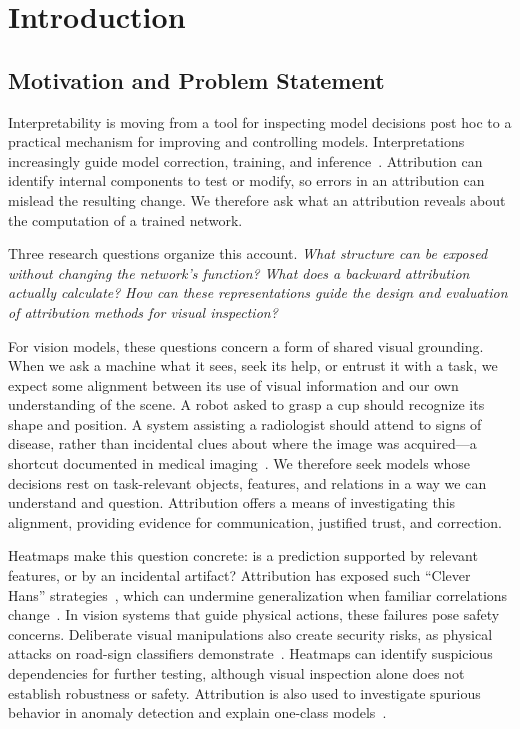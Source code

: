 \chapter{Introduction}\label{ch:introduction}

\section{Motivation and Problem Statement}\label{sec:motivation}

Interpretability is moving from a tool for inspecting model decisions post hoc to a practical mechanism for improving and controlling models. Interpretations increasingly guide model correction, training, and inference~\parencite{Anders2020ClArC,Pahde2023R2R,Ross2017RightReasons,Komorowski2026AGD}.
Attribution can identify internal components to test or modify, so errors in an attribution can mislead the resulting change. We therefore ask what an attribution reveals about the computation of a trained network.

Three research questions organize this account. \emph{What structure can be exposed without changing the network's function?} \emph{What does a backward attribution actually calculate?} \emph{How can these representations guide the design and evaluation of attribution methods for visual inspection?}

For vision models, these questions concern a form of shared visual grounding. When we ask a machine what it sees, seek its help, or entrust it with a task, we expect some alignment between its use of visual information and our own understanding of the scene. A robot asked to grasp a cup should recognize its shape and position. A system assisting a radiologist should attend to signs of disease, rather than incidental clues about where the image was acquired---a shortcut documented in medical imaging~\parencite{Zech2018Pneumonia}. We therefore seek models whose decisions rest on task-relevant objects, features, and relations in a way we can understand and question. Attribution offers a means of investigating this alignment, providing evidence for communication, justified trust, and correction.

Heatmaps make this question concrete: is a prediction supported by relevant features, or by an incidental artifact? Attribution has exposed such ``Clever Hans'' strategies~\parencite{Lapuschkin2019}, which can undermine generalization when familiar correlations change~\parencite{Geirhos2020Shortcut}. In vision systems that guide physical actions, these failures pose safety concerns. Deliberate visual manipulations also create security risks, as physical attacks on road-sign classifiers demonstrate~\parencite{Eykholt2018Physical}. Heatmaps can identify suspicious dependencies for further testing, although visual inspection alone does not establish robustness or safety. Attribution is also used to investigate spurious behavior in anomaly detection and explain one-class models~\parencite{Kauffmann2020CleverHans,Kauffmann2018OneClassDTD}.

